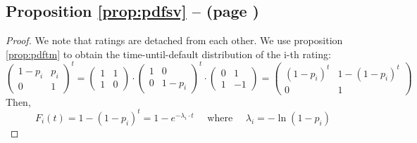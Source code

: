 \documentclass[11pt,fleqn]{book} %
\begin{document}
\subsection{Proposition \ref{prop:pdfsv} --  (page \pageref{prop:pdfsv})}
\begin{proof}
	We note that ratings are detached from each other. We use proposition
	\ref{prop:pdftm} to obtain the time-until-default distribution of the 
	i-th rating:
	\small
	\begin{displaymath}
		\left(
		\begin{array}{cc}
			1-p_i & p_i \\
			0 & 1
		\end{array}
		\right) ^ t 
		= 
		\left(
		\begin{array}{cc}
			1 & 1 \\
			1 & 0
		\end{array}
		\right) 
		\cdot
		\left(
		\begin{array}{cc}
			1 & 0 \\
			0 & 1-p_i
		\end{array}
		\right) ^t 
		\cdot
		\left(
		\begin{array}{cc}
			0 & 1 \\
			1 & -1
		\end{array}
		\right)
		=
		\left(
		\begin{array}{cc}
			(1-p_i)^t & 1-(1-p_i)^t \\
			0 & 1
		\end{array}
		\right)
	\end{displaymath}
	Then,
	\begin{displaymath}
		F_i(t) = 1-(1-p_i)^t = 1 - e^{-\lambda_i \cdot t} \quad \text{ where } \quad \lambda_i = -\ln(1-p_i)
	\end{displaymath}
\end{proof}
\end{document}
